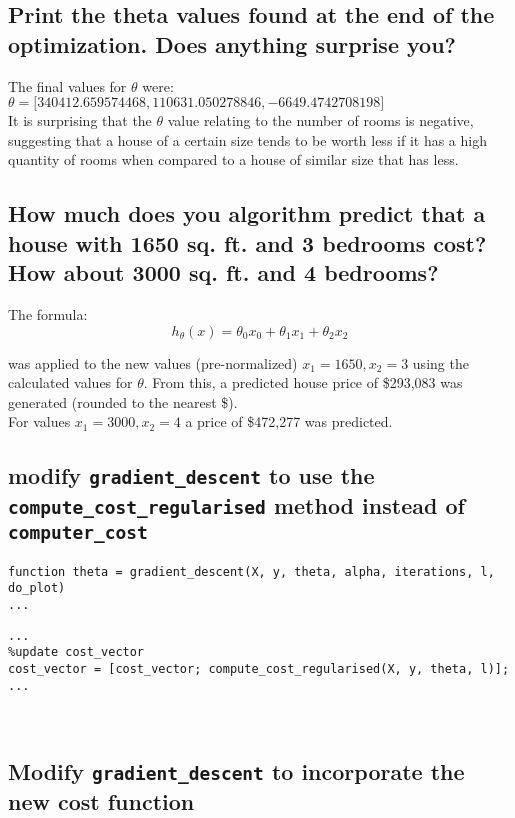 \documentclass[titlepage]{scrartcl}
\newcommand{\code}[1]{\texttt{#1}}
\begin{document}
\subsection{Print the theta values found at the end of the optimization. Does anything surprise you?}
The final values for $\theta$ were:\\
$\theta = \big[ 340412.659574468, 110631.050278846, -6649.4742708198 \big]$\\
          
It is surprising that the $\theta$ value relating to the number of rooms is
negative, suggesting that a house of a certain size tends to be worth less if
it has a high quantity of rooms when compared to a house of similar size that
has less.

\subsection{How much does you algorithm predict that a house with 1650 sq. ft.
and 3 bedrooms cost? How about 3000 sq. ft. and 4 bedrooms?}

The formula:
$$h_\theta(x)=\theta_0x_0+\theta_1x_1+\theta_2x_2$$

was applied to the new values (pre-normalized) $x_1=1650, x_2=3$ using the calculated
values for $\theta$. From this, a predicted house price of \$293,083 was generated
(rounded to the nearest \$).\\
For values $x_1=3000, x_2=4$ a price of \$472,277 was predicted.

\subsection{modify \code{gradient\_descent} to use the
\code{compute\_cost\_regularised} method instead of \code{computer\_cost}}

\begin{lstlisting}
function theta = gradient_descent(X, y, theta, alpha, iterations, l, do_plot)
...
\end{lstlisting}

\begin{lstlisting}[firstnumber=40]
...
%update cost_vector
cost_vector = [cost_vector; compute_cost_regularised(X, y, theta, l)];
...
\end{lstlisting}\leavevmode \\

\subsection{Modify \code{gradient\_descent} to incorporate the new cost function}
\end{document}
